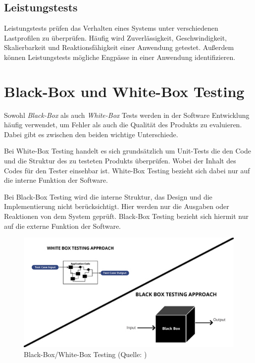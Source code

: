 \documentclass[a4paper, fontsize=11pt, parskip=half, twoside]{scrreprt}
\begin{document}
	\subsection{Leistungstests}
	Leistungstests prüfen das Verhalten eines Systems unter verschiedenen Lastprofilen zu überprüfen. 
	Häufig wird Zuverlässigkeit, Geschwindigkeit, Skalierbarkeit und Reaktionsfähigkeit einer Anwendung getestet. 
	Außerdem können Leistungstests mögliche Engpässe in einer Anwendung identifizieren.
	
	
	\section{Black-Box und White-Box Testing}
	Sowohl \emph{Black-Box} als auch \emph{White-Box} Tests werden in der Software Entwicklung häufig verwendet, um Fehler als auch die Qualität des Produkts zu evaluieren. 
	Dabei gibt es zwischen den beiden wichtige Unterschiede.
	
	Bei White-Box Testing handelt es sich grundsätzlich um Unit-Tests die den Code und die Struktur des zu testeten Produkts überprüfen. 
	Wobei der Inhalt des Codes für den Tester einsehbar ist.
	White-Box Testing bezieht sich dabei nur auf die interne Funktion der Software.
	
	Bei Black-Box Testing wird die interne Struktur, das Design und die Implementierung nicht berücksichtigt.
	Hier werden nur die Ausgaben oder Reaktionen von dem System geprüft.
	Black-Box Testing bezieht sich hiermit nur auf die externe Funktion der Software.
	
	\textcite[Seite 12]{nidhra_black_2012}
	
	\begin{figure}[ht]
		\centering
		\includegraphics[scale=0.6]{assets/WhiteBoxBlackBoxTesting.jpg}
		\caption{Black-Box/White-Box Testing (Quelle: \textcite{khandelwal_difference_2019})}
		\label{fig:WhiteBoxBlackBoxTesting}
	\end{figure}
	
\end{document}
